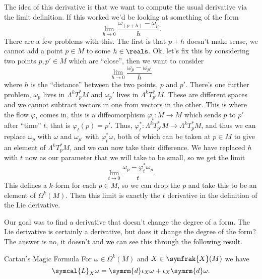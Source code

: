 \documentclass[fleqn]{NotesClass}
\renewcommand{\dl}{\symrm{d}}
\newcommand{\vectorFields}{\symfrak{X}}
\newcommand{\lieDerivative}{\symcal{L}}
\begin{document}
    The idea of this derivative is that we want to compute the usual derivative via the limit definition.
    If this worked we'd be looking at something of the form
    \begin{equation}
        \lim_{h \to 0} \frac{\omega_(p + h) - \omega_p}{h}.
    \end{equation}
    There are a few problems with this.
    The first is that \(p + h\) doesn't make sense, we cannot add a point \(p \in M\) to some \(h \in \reals\).
    Ok, let's fix this by considering two points \(p, p' \in M\) which are \enquote{close}, then we want to consider
    \begin{equation}
        \lim_{h \to 0} \frac{\omega_p - \omega_{p'}}{h}
    \end{equation}
    where \(h\) is the \enquote{distance} between the two points, \(p\) and \(p'\).
    There's one further problem, \(\omega_p\) lives in \(\Lambda^kT_p^*M\) and \(\omega_p'\) lives in \(\Lambda^kT_{p'}^*M\).
    These are different spaces and we cannot subtract vectors in one from vectors in the other.
    This is where the flow \(\varphi_t\) comes in, this is a diffeomorphism \(\varphi_t \colon M \to M\) which sends \(p\) to \(p'\) after \enquote{time} \(t\), that is \(\varphi_t(p) = p'\).
    Thus, \(\varphi_t^* \colon \Lambda^kT_{p'}^*M \to \Lambda^kT_p^*M\), and thus we can replace \(\omega_p\) with \(\omega\) and \(\omega_{p'}\) with \(\varphi_t^*\omega\), both of which can be taken at \(p \in M\) to give an element of \(\Lambda^kT_p^*M\), and we can now take their difference.
    We have replaced \(h\) with \(t\) now as our parameter that we will take to be small, so we get the limit
    \begin{equation}
        \lim_{t \to 0} \frac{\omega_p - \varphi_t^*\omega_p}{t}.
    \end{equation}
    This defines a \(k\)-form for each \(p \in M\), so we can drop the \(p\) and take this to be an element of \(\Omega^k(M)\).
    Then this limit is exactly the \(t\) derivative in the definition of the Lie derivative.
    
    Our goal was to find a derivative that doesn't change the degree of a form.
    The Lie derivative is certainly a derivative, but does it change the degree of the form?
    The answer is no, it doesn't and we can see this through the following result.
    
    \begin{thm}{Cartan's Magic Formula}{}
        For \(\omega \in \Omega^k(M)\) and \(X \in \vectorFields(M)\) we have
        \begin{equation}
            \lieDerivative_X \omega = \dl \iota_X \omega + \iota_X \dl \omega.
        \end{equation}
    \end{thm}
    
\end{document}
